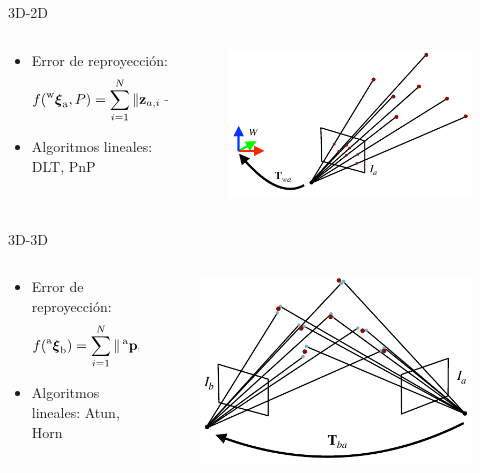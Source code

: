 \begin{frame}
	3D-2D
    \begin{columns}
	\begin{column}{0.7\textwidth}
		\begin{itemize}
			\item Error de reproyección:
			\[
			f(\prescript{\mathrm{\mathrm{w}}}{}{{\boldsymbol{\mathbf{\xi}}}_\mathrm{a}}, P)= \sum_{i=1}^{N} \Vert \boldsymbol{\mathbf{z}}_{a,i} - \hat{\boldsymbol{\mathbf{z}}}({\prescript{\mathrm{\mathrm{w}}}{}{{\boldsymbol{\mathbf{\xi}}}_\mathrm{a}}}^{-1},\prescript{\mathrm{\mathrm{w}}}{}{\boldsymbol{\mathbf{p}}}_{i}) \Vert^{2}
			\]
			\item Algoritmos lineales: DLT, PnP
		\end{itemize}
	\end{column}
	\begin{column}{0.3\textwidth}
		\begin{figure}
			\includegraphics[width=0.5\columnwidth]{./images/localization_3d_2d.pdf}
		\end{figure}
	\end{column}
	\end{columns}
	3D-3D
	\begin{columns}
		\begin{column}{0.7\textwidth}
			\begin{itemize}
				\item Error de reproyección:
				\[
				f(\prescript{\mathrm{a}}{}{{\boldsymbol{\mathbf{\xi}}}_\mathrm{b}})= \sum_{i=1}^{N} \Vert \prescript{\mathrm{a}}{}{\boldsymbol{\mathbf{p}}}_{i} - \prescript{\mathrm{a}}{}{{\boldsymbol{\mathbf{\xi}}}_\mathrm{b}} \prescript{\mathrm{b}}{}{\boldsymbol{\mathbf{p}}}_{i} \Vert^{2}
				\]
				\item Algoritmos lineales: Atun, Horn
			\end{itemize}
		\end{column}
		\begin{column}{0.3\textwidth}
			\begin{figure}
				\includegraphics[width=0.4\columnwidth]{./images/localization_3d_3d.pdf}
			\end{figure}
		\end{column}
	\end{columns}

\end{frame}

